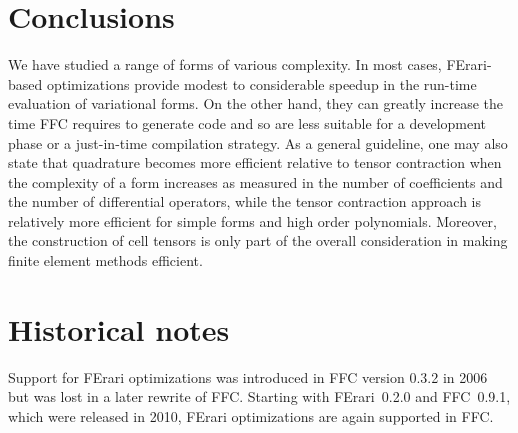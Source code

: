 \section{Conclusions}

We have studied a range of forms of various complexity. In most cases,
FErari-based optimizations provide modest to considerable speedup in
the run-time evaluation of variational forms. On the other hand, they
can greatly increase the time FFC requires to generate code and so are
less suitable for a development phase or a just-in-time compilation
strategy. As a general guideline, one may also state that quadrature
becomes more efficient relative to tensor contraction when the
complexity of a form increases as measured in the number of
coefficients and the number of differential operators, while the
tensor contraction approach is relatively more efficient for simple
forms and high order polynomials. Moreover, the construction of
cell tensors is only part of the overall consideration in making
finite element methods efficient.

\section{Historical notes}

Support for FErari optimizations was introduced in FFC version 0.3.2
in 2006 but was lost in a later rewrite of FFC. Starting with
FErari~0.2.0 and FFC~0.9.1, which were released in 2010, FErari
optimizations are again supported in FFC.
